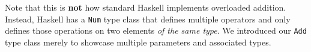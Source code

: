 Note that this is \textbf{not} how standard Haskell implements overloaded addition. Instead, Haskell has a \verb|Num| type class that defines multiple operators and only defines those operations on two elements \textit{of the same type}. We introduced our \verb|Add| type class merely to showcase multiple parameters and associated types.
